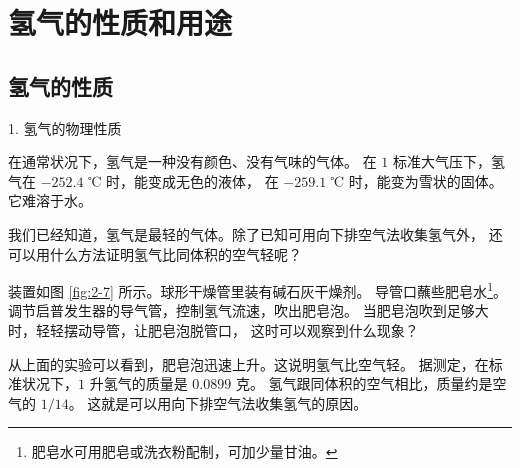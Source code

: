 \section{氢气的性质和用途}\label{sec:2-3}

\subsection{氢气的性质}

1. 氢气的物理性质

在通常状况下，氢气是一种没有颜色、没有气味的气体。
在 $1$ 标准大气压下，氢气在 $-252.4$ ℃ 时，能变成无色的液体，
在 $-259.1$ ℃ 时，能变为雪状的固体。它难溶于水。

我们已经知道，氢气是最轻的气体。除了已知可用向下排空气法收集氢气外，
还可以用什么方法证明氢气比同体积的空气轻呢？

\begin{shiyan}
    装置如图 \ref{fig:2-7} 所示。球形干燥管里装有碱石灰干燥剂。
    导管口蘸些肥皂水\footnote{肥皂水可用肥皂或洗衣粉配制，可加少量甘油。}。
    调节启普发生器的导气管，控制氢气流速，吹出肥皂泡。
    当肥皂泡吹到足够大时，轻轻摆动导管，让肥皂泡脱管口，
    这时可以观察到什么现象？
\end{shiyan}

从上面的实验可以看到，肥皂泡迅速上升。这说明氢气比空气轻。
据测定，在标准状况下，$1$ 升氢气的质量是 $0.0899$ 克。
氢气跟同体积的空气相比，质量约是空气的 $1/14$。
这就是可以用向下排空气法收集氢气的原因。

